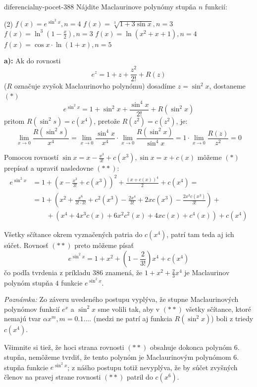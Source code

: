 \begin{defproblem}{diferencialny-pocet-388}
Nájdite Maclaurinove polynómy stupňa $n$ funkcií:
\begin{tasks}(2)
  \task $f(x)=e^{\sin^2 x},n=4$
  \task $f(x)=\sqrt[3]{1+3\sin x},n=3$
  \task $f(x)=\ln^3 (1-\frac{x}{2}),n=3$
  \task $f(x)=\ln (x^2+x+1),n=4$
  \task $f(x)=\cos x\cdot\ln (1+x),n=5$
\end{tasks}

\begin{solution}
  \textbf{a):}
  Ak do rovnosti
  \[
    e^z=1+z+\frac{z^2}{2!}+R(z)
  \]
  ($R$ označuje zvyšok Maclaurinovho polynómu) dosadíme $z=\sin^2 x$, dostaneme
  $(*)$
  \[
    e^{\sin^2 x}=1+\sin^2 x+\frac{\sin^4 x}{2!}+R(\sin^2 x)
  \]
  pritom $R(\sin^2 s)=c(x^4)$, pretože $R(z^2)=c(z^2)$, je:
  \[
    \lim\limits_{x\rightarrow 0}\frac{R(\sin^2 s)}{x^4}
      = \lim\limits_{x \rightarrow 0}
          \frac{\sin^4 x}{x^4}
        \cdot
        \lim\limits_{x \rightarrow 0}\frac{R(\sin^2 x)}{\sin^4x}
      = 1 \cdot \lim\limits_{x \rightarrow 0}\frac{R(z)}{z^2}=0
  \]

  Pomocou rovností $\sin x=x-\frac{x^3}{3!}+c(x^3),\sin x=x+c(x)$ môžeme $(*)$
  prepísať a upraviť nasledovne $(**)$:
  \begin{align*}
    e^{\sin^2 x}
      &= 1 + (x-\frac{x^3}{3!}+c(x^3))^2+\frac{(x+c(x))^4}{2}+c(x^4) = \\
      &= 1 + (x^2+\frac{x^6}{3!\cdot 3!}+c^2 (x^3)-\frac{2x^4}{3!}+2xc(x^3)
        - \frac{2x^3c(x^3)}{3!}) + \\
        & \qquad + (x^4+4x^3c(x)+6x^2c^2(x)+4xc(x)+c^4(x))+c(x^4)
  \end{align*}

  Všetky sčítance okrem vyznačených patria do $c(x^4)$, patrí tam teda aj ich
  súčet. Rovnosť $(**)$ preto môžeme písať
  \[
    e^{\sin^2 x}=1+x^2+(1-\frac{2}{3!})x^4+c(x^4)
  \]
  čo podľa tvrdenia z príkladu $386$ znamená, že $1+x^2+\frac{2}{3}x^4$ je
  Maclaurinov polynóm stupňa $4$ funkcie $e^{\sin^2 x}$.

  \textit{Poznámka:}
  Zo záveru uvedeného postupu vyplýva, že stupne Maclaurinových polynómov
  funkcií $e^x$ a $\sin^2 x$ sme volili tak, aby v $(**)$ všetky sčítance, ktoré
  nemajú tvar $\alpha x^m,m=0.1....$ (medzi ne patrí aj funkcia $R(\sin^2 x)$)
  boli z triedy $c(x^4)$.

  Všimnite si tiež, že hoci strana rovnosti $(**)$ obsahuje dokonca polynóm $6.$
  stupňa, nemôžeme tvrdiť, že tento polynóm je Maclaurinovým polynómom $6.$
  stupňa funkcie $e^{\sin^2 x}$; z nášho postupu totiž nevyplýva, že by súčet
  zvyšných členov na pravej strane rovnosti $(**)$ patril do $c(x^6)$.
\end{solution}
\end{defproblem}

